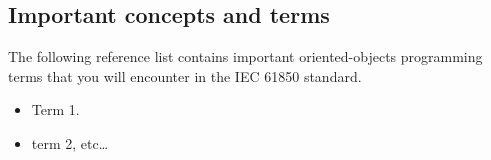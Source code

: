 \subsection{Important concepts and terms}

The following reference list contains important 
oriented-objects programming terms 
that you will encounter in the IEC 61850 standard. 
\begin{itemize}
  \item Term  1.
  \item term 2, etc\ldots
\end{itemize}

